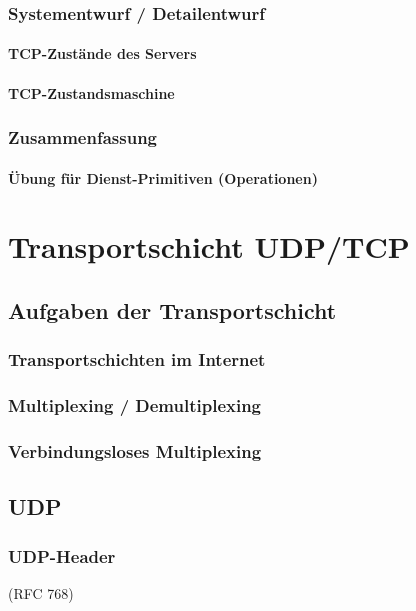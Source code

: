 \subsection{Systementwurf / Detailentwurf}
\subsubsection{TCP-Zustände des Servers}
\subsubsection{TCP-Zustandsmaschine}
\subsection{Zusammenfassung}
\subsubsection{Übung für Dienst-Primitiven (Operationen)}

\chapter{Transportschicht UDP/TCP}
\section{Aufgaben der Transportschicht}
\subsection{Transportschichten im Internet}
\subsection{Multiplexing / Demultiplexing}
\subsection{Verbindungsloses Multiplexing}
\section{UDP}
\subsection{UDP-Header}
(RFC 768)
